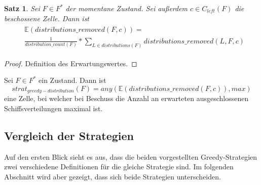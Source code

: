 \documentclass[a4paper,12pt]{llncs}
\numberwithin{equation}{section}
\newtheorem{satz}{Satz}
\begin{document}
\begin{satz}
Sei $F\in F^*$ der momentane Zustand.
Sei außerdem $c \in C_{left}(F)$ die beschossene Zelle.
Dann ist
\begin{align}
\begin{split}
&\mathds{E}(distributions\_removed(F,c))=\\
&\frac{1}{distribution\_count(F)} * \sum_{L \in distributions(F)} distributions\_removed(L, F, c) \nonumber
\end{split}
\end{align}
\end{satz}

\begin{proof}
Definition des Erwartungswertes.
\end{proof}

\begin{definition}
Sei $F\in F^*$ ein Zustand.
Dann ist
\[
strat_{greedy-distribution}(F)=any(\mathds{E}(distributions\_removed(F,c)), max)
\]
eine Zelle, bei welcher bei Beschuss die Anzahl an erwarteten ausgeschlossenen Schiffsverteilungen maximal ist.
\end{definition}

\subsection{Vergleich der Strategien}
Auf den ersten Blick sieht es aus, dass die beiden vorgestellten Greedy-Strategien zwei verschiedene Definitionen für die gleiche Strategie sind. Im folgenden Abschnitt wird aber gezeigt, dass sich beide Strategien unterscheiden.
\end{document}
